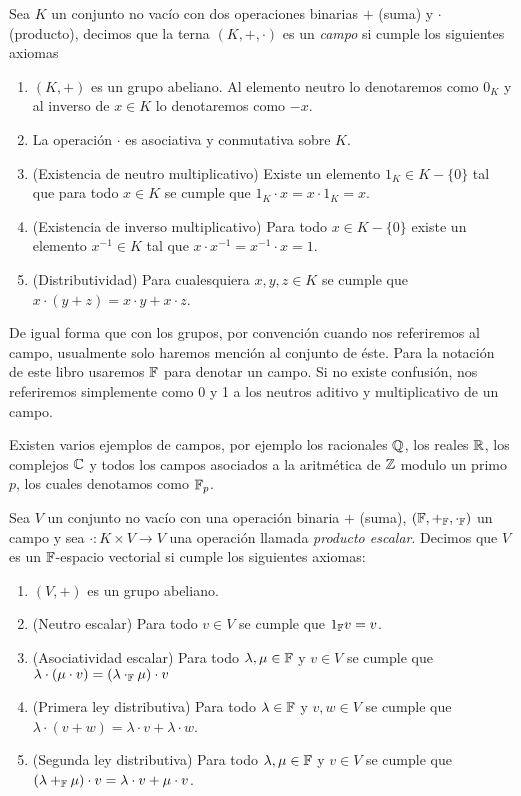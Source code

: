 \begin{defi}
  Sea $K$ un conjunto no vacío con dos operaciones binarias $+$ (suma) y $\cdot$ (producto), decimos que la terna $(K, +, \cdot)$ es un \emph{campo} si cumple los siguientes axiomas
  \begin{enumerate}
    \item $(K,+)$ es un grupo abeliano. Al elemento neutro lo denotaremos como $0_K$ y al inverso de $x \in K$ lo denotaremos como $-x$.
    \item La operación $\cdot$ es asociativa y conmutativa sobre $K$.
    \item (Existencia de neutro multiplicativo) Existe un elemento $1_K \in K-\{0\}$ tal que para todo $x \in K$ se cumple que $1_K\cdot x = x\cdot 1_K = x$.
    \item (Existencia de inverso multiplicativo) Para todo $x \in K-\{0\}$ existe un elemento $ x^{-1} \in K$ tal que $x \cdot x^{-1} = x^{-1} \cdot x = 1$.
    \item (Distributividad) Para cualesquiera $x, y, z \in K$ se cumple que $x \cdot (y + z) = x \cdot y + x \cdot z$.
  \end{enumerate}
\end{defi}

De igual forma que con los grupos, por convención cuando nos referiremos al campo, usualmente solo haremos mención al conjunto de éste. Para la notación de este libro usaremos $\mathbb{F}$ para denotar un campo. Si no existe confusión, nos referiremos simplemente como 0 y 1 a los neutros aditivo y multiplicativo de un campo.

Existen varios ejemplos de campos, por ejemplo los racionales $\mathbb{Q}$, los reales $\mathbb{R}$, los complejos $\mathbb{C}$ y todos los campos asociados a la aritmética de $\mathbb{Z}$ modulo un primo $p$, los cuales denotamos como $\mathbb{F}_p$.

\begin{defi}
  Sea $V$ un conjunto no vacío con una operación binaria $+$ (suma), $(\mathbb{F}, +_{\mathbb{F}}, \cdot_{\mathbb{F}} )$ un campo y sea $\cdot\colon K \times V \to V$ una operación llamada \emph{producto escalar}. Decimos que $V$ es un $\mathbb{F}$-espacio vectorial si cumple los siguientes axiomas:
  \begin{enumerate}
    \item $(V, +)$ es un grupo abeliano.
    \item (Neutro escalar) Para todo $v \in V$ se cumple que $1_{\mathbb{F}} v = v$.
    \item (Asociatividad escalar) Para todo $\lambda, \mu \in \mathbb{F}$ y $v \in V$ se cumple que $\lambda \cdot (\mu \cdot v) = (\lambda \cdot_{\mathbb{F}} \mu)  \cdot v$
    \item (Primera ley distributiva) Para todo $\lambda \in \mathbb{F}$ y $v,w \in V$ se cumple que $\lambda \cdot (v + w) = \lambda \cdot v + \lambda \cdot w$.
    \item (Segunda ley distributiva) Para todo $\lambda, \mu \in \mathbb{F}$ y $v\in V$ se cumple que $(\lambda +_{\mathbb{F}} \mu)\cdot v = \lambda \cdot v + \mu \cdot v$.
  \end{enumerate}
\end{defi}

